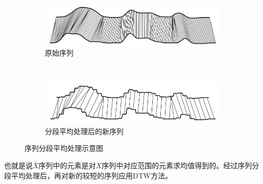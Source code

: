 \begin{figure}[h]
    \centering
    \begin{subfigure}[b]{0.45\textwidth}
        \includegraphics[width=\textwidth]{./figure/original.PNG}
        \caption{原始序列}
        \label{fig:subfig:original}
    \end{subfigure}
    ~ %
    \begin{subfigure}[b]{0.45\textwidth}
        \includegraphics[width=\textwidth]{./figure/new.PNG}
        \caption{分段平均处理后的新序列}
        \label{fig:subfig:new}
    \end{subfigure}
    \caption{序列分段平均处理示意图}\label{fig:9}
\end{figure}
也就是说$\bar{X}$序列中的元素是对$X$序列中对应范围的元素求均值得到的。经过序列分段平均处理后，再对新的较短的序列应用DTW方法。

